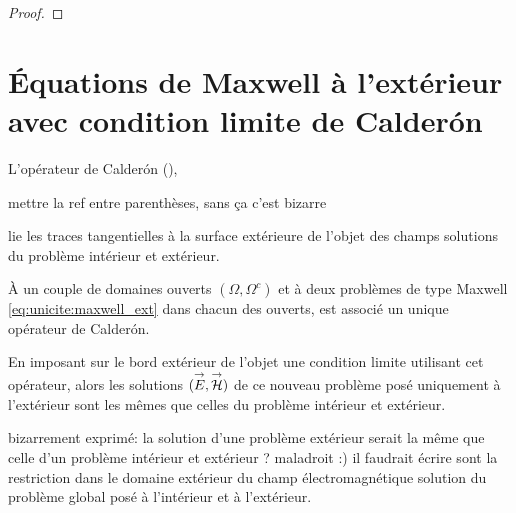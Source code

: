 \begin{proof}
      
    
    \end{proof}      

\section{Équations de Maxwell à l'extérieur avec condition limite de Calderón}
  L'opérateur de Calderón (\cite[Def~4, p.~108]{cessenat_mathematical_1996}),
  \begin{REM}
  mettre la ref entre parenthèses, sans ça c'est bizarre
\end{REM} lie les traces tangentielles à la surface extérieure de l'objet des champs solutions du problème intérieur et extérieur.
  
  À un couple de domaines ouverts \((\Omega, \Omega^c)\) et à deux problèmes de type Maxwell \eqref{eq:unicite:maxwell_ext} dans chacun des ouverts, est associé un unique opérateur de Calderón.

  En imposant sur le bord extérieur de l'objet une condition limite utilisant cet opérateur, alors les solutions \(({\overset{\rightarrow}{E}},{\overset{\rightarrow}{\mathcal{H}}})\) de ce nouveau problème posé uniquement à l'extérieur sont les mêmes que celles du problème intérieur et extérieur.
  \begin{REM}
  bizarrement exprimé: la solution d'une problème extérieur serait la même que celle d'un problème intérieur et extérieur ? maladroit :)
  il faudrait écrire sont la restriction dans le domaine extérieur du champ électromagnétique solution du problème global posé à l'intérieur et à l'extérieur.
\end{REM}


